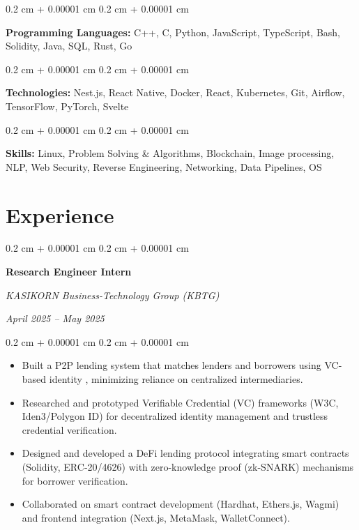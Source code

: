 \documentclass[10pt,letterpaper]{extarticle}
\newenvironment{highlights}{
    \begin{itemize}[
        topsep=0.10 cm,
        parsep=0.10 cm,
        partopsep=0pt,
        itemsep=0pt,
        leftmargin=0.4 cm + 10pt
    ]
}{
    \end{itemize}
} %
\newenvironment{onecolentry}{
    \begin{adjustwidth}{
        0.2 cm + 0.00001 cm
    }{
        0.2 cm + 0.00001 cm
    }
}{
    \end{adjustwidth}
} %
\newenvironment{twocolentry}[2][]{
    \onecolentry
    \def\secondColumn{#2}
    \setcolumnwidth{\fill, 5.0 cm}
    \begin{paracol}{2}
}{
    \switchcolumn \raggedleft \secondColumn
    \end{paracol}
    \endonecolentry
} %
\begin{document}
        \begin{onecolentry}
            \textbf{Programming Languages:} C++, C, Python, JavaScript, TypeScript, Bash, Solidity, Java, SQL, Rust, Go
        \end{onecolentry}


        \begin{onecolentry}
            \textbf{Technologies:} Nest.js, React Native, Docker, React, Kubernetes, Git, Airflow, TensorFlow, PyTorch, Svelte
        \end{onecolentry}


        \begin{onecolentry}
            \textbf{Skills:} Linux, Problem Solving \& Algorithms, Blockchain, Image processing, NLP, Web Security, Reverse Engineering, Networking, Data Pipelines, OS
        \end{onecolentry}

    \section{Experience}

        \begin{twocolentry}{
            \textit{April 2025 – May 2025}}
            \textbf{Research Engineer Intern}

            \textit{KASIKORN Business-Technology Group (KBTG)}
        \end{twocolentry}

        \vspace{0.10 cm}
        \begin{onecolentry}
            \begin{highlights}
                \item Built a P2P lending system that matches lenders and borrowers using VC-based identity , minimizing reliance on centralized intermediaries.
                \item Researched and prototyped Verifiable Credential (VC) frameworks (W3C, Iden3/Polygon ID) for decentralized identity management and trustless credential verification.
                \item Designed and developed a DeFi lending protocol integrating smart contracts (Solidity, ERC-20/4626) with zero-knowledge proof (zk-SNARK) mechanisms for borrower verification.
                \item Collaborated on smart contract development (Hardhat, Ethers.js, Wagmi) and frontend integration (Next.js, MetaMask, WalletConnect).
            \end{highlights}
        \end{onecolentry}
\end{document}

